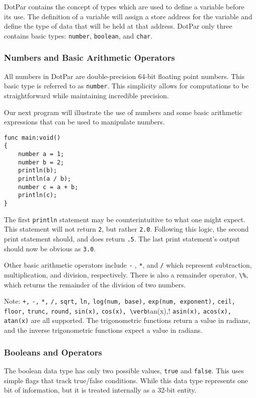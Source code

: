 \documentclass{article}
\begin{document}
DotPar contains the concept of types which are used to define a variable before its use.  The definition of a variable will assign a store address for the variable and define the type of data that will be held at that address.  DotPar only three contains basic types: \verb!number!, \verb!boolean!, and \verb!char!.

\subsubsection{Numbers and Basic Arithmetic Operators}
All numbers in DotPar are double-precision 64-bit floating point numbers.  This basic type is referred to as \verb!number!.  This simplicity allows for computations to be straightforward while maintaining incredible precision.

Our next program will illustrate the use of numbers and some basic arithmetic expressions that can be used to manipulate numbers.

\begin{verbatim}
func main:void()
{
    number a = 1;
    number b = 2;
    println(b);
    println(a / b);
    number c = a + b;
    println(c);
}
\end{verbatim}

The first \verb!println! statement may be counterintuitive to what one might expect.  This statement will not return \verb!2!, but rather \verb!2.0!.  Following this logic, the second print statement should, and does return \verb!.5!.  The last print statement's output should now be obvious as \verb!3.0!.

Other basic arithmetic operators include \verb!-! , \verb!*!, and \verb!/! which represent subtraction, multiplication, and division, respectively.  There is also a remainder operator, \verb!\%!,  which returns the remainder of the division of two numbers.

Note: \verb!+,! \verb!-,! \verb!*,! \verb!/,! \verb!sqrt,! \verb!ln,! \verb!log(num, base),! \verb!exp(num, exponent),! \verb!ceil,! \verb!floor,! \verb!trunc,! \verb!round,! \verb!sin(x),! \verb!cos(x), \verb!tan(x),! \verb!asin(x),! \verb!acos(x),! \verb!atan(x)! are all supported. The trigonometric functions return a value in radians, and the inverse trigonometric functions expect a value in radians.

\subsubsection{Booleans and Operators}
The boolean data type has only two possible values, \verb!true! and \verb!false!.  This uses simple flags that track true/false conditions. While this data type represents one bit of information, but it is treated internally as a 32-bit entity.
\end{document}
